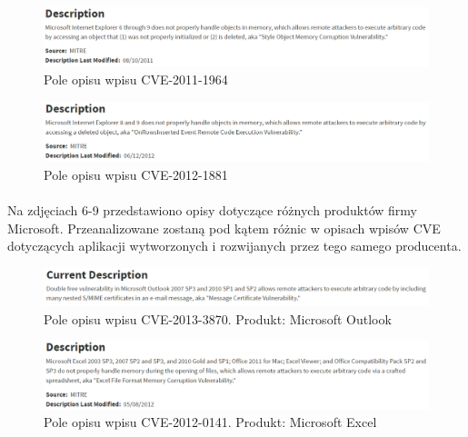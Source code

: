 \documentclass[a4paper,12pt,twoside]{article}
\begin{document}
\begin{figure}
    \centering
    \includegraphics[width=1.0\textwidth]{image/004CVE20111964.png}
    \caption{Pole opisu wpisu CVE-2011-1964}
    \label{fig:Rysunek 4}
\end{figure}

\begin{figure}
    \centering
    \includegraphics[width=1.0\textwidth]{image/005CVE20121881.png}
    \caption{Pole opisu wpisu CVE-2012-1881}
    \label{fig:Rysunek 5}
\end{figure}

\paragraph{}
Na zdjęciach 6-9 przedstawiono opisy dotyczące różnych produktów firmy Microsoft. Przeanalizowane zostaną pod kątem różnic w opisach wpisów CVE dotyczących aplikacji wytworzonych i rozwijanych przez tego samego producenta. 

\begin{figure}
    \centering
    \includegraphics[width=1.0\textwidth]{image/006CVE20133870.png}
    \caption{Pole opisu wpisu CVE-2013-3870. Produkt: Microsoft Outlook}
    \label{fig:Rysunek 6}
\end{figure}

\begin{figure}
    \centering
    \includegraphics[width=1.0\textwidth]{image/007CVE20120141.png}
    \caption{Pole opisu wpisu CVE-2012-0141. Produkt: Microsoft Excel}
    \label{fig:Rysunek 7}
\end{figure}
\end{document}
